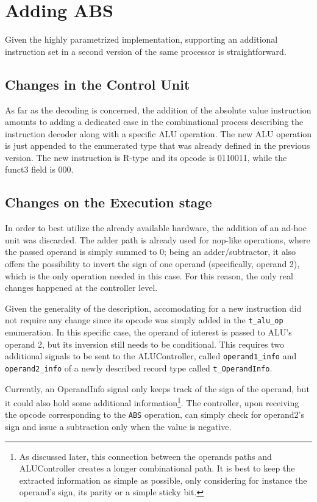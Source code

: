 \section{Adding ABS}
\label{sec:adding-abs}
Given the highly parametrized implementation, supporting an additional instruction set in a second version of the same processor is straightforward.
\subsection{Changes in the Control Unit}
As far as the decoding is concerned, the addition of the absolute value instruction amounts to adding a dedicated case in the combinational process describing the instruction decoder along with a specific ALU operation. The new ALU operation is just appended to the enumerated type that was already defined in the previous version. The new instruction is R-type and its opcode is 0110011, while the funct3 field is 000.
\subsection{Changes on the Execution stage}
In order to best utilize the already available hardware, the addition of an ad-hoc unit was discarded. The adder path
is already used for nop-like operations, where the passed operand is simply summed to 0; being an adder/subtractor,
it also offers the possibility to invert the sign of one operand (specifically, operand 2), which is the only operation
needed in this case. For this reason, the only real changes happened at the controller level.

Given the generality of the description, accomodating for a new instruction did not require any change since its opcode
was simply added in the \texttt{t\_alu\_op} enumeration. In this specific case, the operand of interest is passed to
ALU's operand 2, but its inversion still needs to be conditional. This requires two additional signals to be sent to the
ALUController, called \texttt{operand1\_info} and \texttt{operand2\_info} of a newly described record type called
\texttt{t\_OperandInfo}.

Currently, an OperandInfo signal only keeps track of the sign of the operand, but it could also hold some additional
information\footnote{As discussed later, this connection between the operands paths and ALUController creates a longer
combinational path. It is best to keep the extracted information as simple as possible, only considering for instance
the operand's sign, its parity or a simple sticky bit.}. The controller, upon receiving the opcode corresponding to the
\texttt{ABS} operation, can simply check for operand2's sign and issue a subtraction only when the value is negative.

